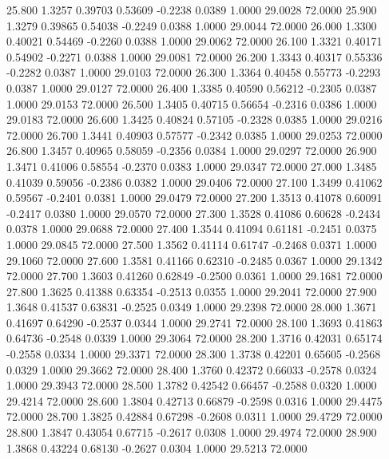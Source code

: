   25.800   1.3257   0.39703   0.53609  -0.2238   0.0389   1.0000  29.0028  72.0000
  25.900   1.3279   0.39865   0.54038  -0.2249   0.0388   1.0000  29.0044  72.0000
  26.000   1.3300   0.40021   0.54469  -0.2260   0.0388   1.0000  29.0062  72.0000
  26.100   1.3321   0.40171   0.54902  -0.2271   0.0388   1.0000  29.0081  72.0000
  26.200   1.3343   0.40317   0.55336  -0.2282   0.0387   1.0000  29.0103  72.0000
  26.300   1.3364   0.40458   0.55773  -0.2293   0.0387   1.0000  29.0127  72.0000
  26.400   1.3385   0.40590   0.56212  -0.2305   0.0387   1.0000  29.0153  72.0000
  26.500   1.3405   0.40715   0.56654  -0.2316   0.0386   1.0000  29.0183  72.0000
  26.600   1.3425   0.40824   0.57105  -0.2328   0.0385   1.0000  29.0216  72.0000
  26.700   1.3441   0.40903   0.57577  -0.2342   0.0385   1.0000  29.0253  72.0000
  26.800   1.3457   0.40965   0.58059  -0.2356   0.0384   1.0000  29.0297  72.0000
  26.900   1.3471   0.41006   0.58554  -0.2370   0.0383   1.0000  29.0347  72.0000
  27.000   1.3485   0.41039   0.59056  -0.2386   0.0382   1.0000  29.0406  72.0000
  27.100   1.3499   0.41062   0.59567  -0.2401   0.0381   1.0000  29.0479  72.0000
  27.200   1.3513   0.41078   0.60091  -0.2417   0.0380   1.0000  29.0570  72.0000
  27.300   1.3528   0.41086   0.60628  -0.2434   0.0378   1.0000  29.0688  72.0000
  27.400   1.3544   0.41094   0.61181  -0.2451   0.0375   1.0000  29.0845  72.0000
  27.500   1.3562   0.41114   0.61747  -0.2468   0.0371   1.0000  29.1060  72.0000
  27.600   1.3581   0.41166   0.62310  -0.2485   0.0367   1.0000  29.1342  72.0000
  27.700   1.3603   0.41260   0.62849  -0.2500   0.0361   1.0000  29.1681  72.0000
  27.800   1.3625   0.41388   0.63354  -0.2513   0.0355   1.0000  29.2041  72.0000
  27.900   1.3648   0.41537   0.63831  -0.2525   0.0349   1.0000  29.2398  72.0000
  28.000   1.3671   0.41697   0.64290  -0.2537   0.0344   1.0000  29.2741  72.0000
  28.100   1.3693   0.41863   0.64736  -0.2548   0.0339   1.0000  29.3064  72.0000
  28.200   1.3716   0.42031   0.65174  -0.2558   0.0334   1.0000  29.3371  72.0000
  28.300   1.3738   0.42201   0.65605  -0.2568   0.0329   1.0000  29.3662  72.0000
  28.400   1.3760   0.42372   0.66033  -0.2578   0.0324   1.0000  29.3943  72.0000
  28.500   1.3782   0.42542   0.66457  -0.2588   0.0320   1.0000  29.4214  72.0000
  28.600   1.3804   0.42713   0.66879  -0.2598   0.0316   1.0000  29.4475  72.0000
  28.700   1.3825   0.42884   0.67298  -0.2608   0.0311   1.0000  29.4729  72.0000
  28.800   1.3847   0.43054   0.67715  -0.2617   0.0308   1.0000  29.4974  72.0000
  28.900   1.3868   0.43224   0.68130  -0.2627   0.0304   1.0000  29.5213  72.0000
